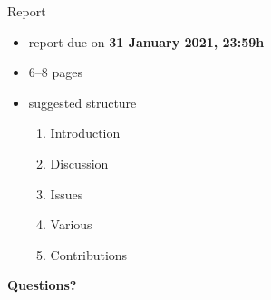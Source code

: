 \begin{frame}{Report}
  \begin{itemize}
    \item report due on \textbf{31 January 2021, 23:59h}
    \item 6--8 pages
    \item suggested structure
    \begin{enumerate}
      \item Introduction
      \item Discussion
      \item Issues
      \item Various
      \item Contributions
    \end{enumerate}
  \end{itemize}
\end{frame}

\begin{frame}
  \begin{center}
    \alert{\textbf{Questions?}}
  \end{center}
\end{frame}